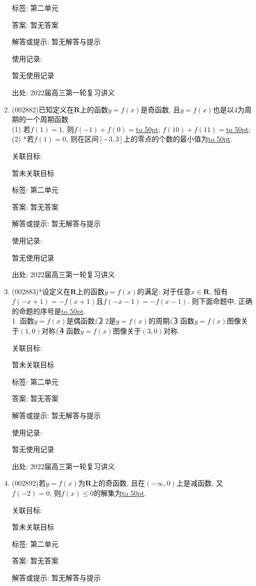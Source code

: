 \documentclass[10pt,a4paper]{article}
\newcommand{\blank}[1]{\underline{\hbox to #1pt{}}}
\begin{document}
\begin{enumerate}[1.]
标签: 第二单元

答案: 暂无答案

解答或提示: 暂无解答与提示

使用记录:

暂无使用记录


出处: 2022届高三第一轮复习讲义
\item { (002882)}已知定义在$\mathbf{R}$上的函数$y=f(x)$是奇函数, 且$y=f(x)$也是以4为周期的一个周期函数.\\
(1) 若$f(1)=1$, 则$f(-1)+f(0)=$\blank{50}; $f(10)+f(11)=$\blank{50};\\
(2) *若$f(1)=0$, 则在区间$[-3,3]$上的零点的个数的最小值为\blank{50}.


关联目标:

暂未关联目标



标签: 第二单元

答案: 暂无答案

解答或提示: 暂无解答与提示

使用记录:

暂无使用记录


出处: 2022届高三第一轮复习讲义
\item { (002883)}*设定义在$\mathbf{R}$上的函数$y=f(x)$的满足: 对于任意$x\in \mathbf{R}$, 恒有$f(-x+1)=-f(x+1)$且$f(-x-1)=-f(x-1)$. 则下面命题中, 正确的命题的序号是\blank{50}.\\
\textcircled{1} 函数$y=f(x)$是偶函数; \textcircled{2} $2$是$y=f(x)$的周期; \textcircled{3} 函数$y=f(x)$图像关于$(1,0)$对称; \textcircled{4} 函数$y=f(x)$图像关于$(3,0)$对称.


关联目标:

暂未关联目标



标签: 第二单元

答案: 暂无答案

解答或提示: 暂无解答与提示

使用记录:

暂无使用记录


出处: 2022届高三第一轮复习讲义
\item { (002892)}若$y=f(x)$为$\mathbf{R}$上的奇函数, 且在$(-\infty,0)$上是减函数, 又$f(-2)=0$, 则$f(x)\le 0$的解集为\blank{50}.


关联目标:

暂未关联目标



标签: 第二单元

答案: 暂无答案

解答或提示: 暂无解答与提示


\end{enumerate}
\end{document}
